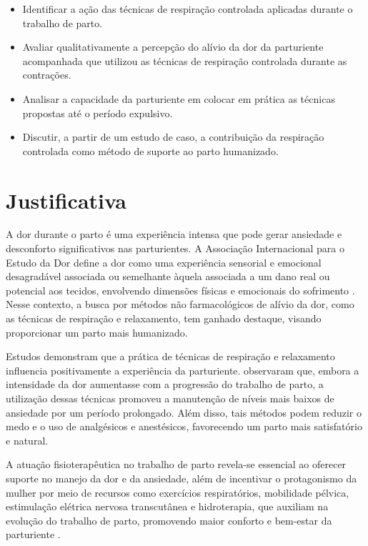 \documentclass[openright]{normas-utf-tex}
\begin{document}
\begin{itemize}
    \item Identificar a ação das técnicas de respiração controlada aplicadas durante o trabalho de parto.
    \item Avaliar qualitativamente a percepção do alívio da dor da parturiente acompanhada que utilizou as técnicas de respiração controlada durante as contrações.
    \item Analisar a capacidade da parturiente em colocar em prática as técnicas propostas até o período expulsivo.
    \item Discutir, a partir de um estudo de caso, a contribuição da respiração controlada como método de suporte ao parto humanizado.
\end{itemize}

\chapter{Justificativa}
\label{chap:justificativa}

A dor durante o parto é uma experiência intensa que pode gerar ansiedade e desconforto significativos nas parturientes. A Associação Internacional para o Estudo da Dor define a dor como uma experiência sensorial e emocional desagradável associada ou semelhante àquela associada a um dano real ou potencial aos tecidos, envolvendo dimensões físicas e emocionais do sofrimento \cite{raja2020}. Nesse contexto, a busca por métodos não farmacológicos de alívio da dor, como as técnicas de respiração e relaxamento, tem ganhado destaque, visando proporcionar um parto mais humanizado.

Estudos demonstram que a prática de técnicas de respiração e relaxamento influencia positivamente a experiência da parturiente.  observaram que, embora a intensidade da dor aumentasse com a progressão do trabalho de parto, a utilização dessas técnicas promoveu a manutenção de níveis mais baixos de ansiedade por um período prolongado. Além disso, tais métodos podem reduzir o medo e o uso de analgésicos e anestésicos, favorecendo um parto mais satisfatório e natural.

A atuação fisioterapêutica no trabalho de parto revela-se essencial ao oferecer suporte no manejo da dor e da ansiedade, além de incentivar o protagonismo da mulher por meio de recursos como exercícios respiratórios, mobilidade pélvica, estimulação elétrica nervosa transcutânea e hidroterapia, que auxiliam na evolução do trabalho de parto, promovendo maior conforto e bem-estar da parturiente \cite{sousa2021}.
\end{document}
